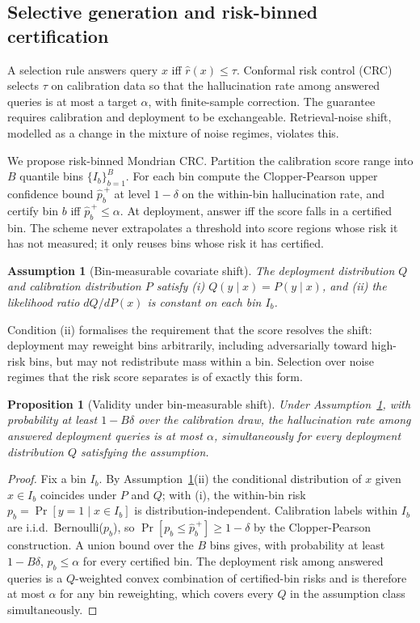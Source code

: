 \documentclass[sn-basic]{sn-jnl}
\theoremstyle{thmstyleone}
\newtheorem{proposition}{Proposition}
\newtheorem{assumption}{Assumption}
\theoremstyle{thmstyletwo}
\begin{document}
\subsection{Selective generation and risk-binned certification}
\label{sec:methodconformal}
A selection rule answers query $x$ iff $\hat r(x) \le \tau$. Conformal
risk control (CRC) selects $\tau$ on calibration data so that the
hallucination rate among answered queries is at most a target $\alpha$,
with finite-sample correction. The guarantee requires calibration and
deployment to be exchangeable. Retrieval-noise shift, modelled as a
change in the mixture of noise regimes, violates this.

We propose risk-binned Mondrian CRC. Partition the calibration score
range into $B$ quantile bins $\{I_b\}_{b=1}^{B}$. For each bin compute
the Clopper-Pearson upper confidence bound $\widehat p^{\,+}_b$ at
level $1 - \delta$ on the within-bin hallucination rate, and certify
bin $b$ iff $\widehat p^{\,+}_b \le \alpha$. At deployment, answer iff
the score falls in a certified bin. The scheme never extrapolates a
threshold into score regions whose risk it has not measured; it only
reuses bins whose risk it has certified.

\begin{assumption}[Bin-measurable covariate shift]\label{ass:shift}
The deployment distribution $Q$ and calibration distribution $P$
satisfy (i) $Q(y \mid x) = P(y \mid x)$, and (ii) the likelihood ratio
$dQ/dP(x)$ is constant on each bin $I_b$.
\end{assumption}

Condition (ii) formalises the requirement that the score resolves the
shift: deployment may reweight bins arbitrarily, including
adversarially toward high-risk bins, but may not redistribute mass
within a bin. Selection over noise regimes that the risk score
separates is of exactly this form.

\begin{proposition}[Validity under bin-measurable shift]
\label{prop:riskbin}
Under Assumption~\ref{ass:shift}, with probability at least
$1 - B\delta$ over the calibration draw, the hallucination rate among
answered deployment queries is at most $\alpha$, simultaneously for
every deployment distribution $Q$ satisfying the assumption.
\end{proposition}

\begin{proof}
Fix a bin $I_b$. By Assumption~\ref{ass:shift}(ii) the conditional
distribution of $x$ given $x \in I_b$ coincides under $P$ and $Q$;
with (i), the within-bin risk $p_b = \Pr[y = 1 \mid x \in I_b]$ is
distribution-independent. Calibration labels within $I_b$ are i.i.d.\
Bernoulli($p_b$), so $\Pr[p_b \le \widehat p^{\,+}_b] \ge 1 - \delta$
by the Clopper-Pearson construction. A union bound over the $B$ bins
gives, with probability at least $1 - B\delta$, $p_b \le \alpha$ for
every certified bin. The deployment risk among answered queries is a
$Q$-weighted convex combination of certified-bin risks and is therefore
at most $\alpha$ for any bin reweighting, which covers every $Q$ in the
assumption class simultaneously.
\end{proof}
\end{document}
